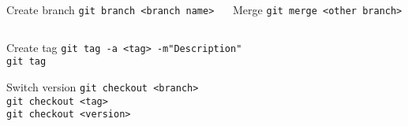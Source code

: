 \documentclass{beamer}
\begin{document}
\begin{frame}[t,squeeze]
\begin{columns}[T]
\begin{column}{.66\linewidth}
\begin{columns}
\begin{column}{.45\linewidth}
\begin{block}{Create branch}
                                \texttt{git branch <branch name>}
                        \end{block}
                    \end{column}
                    \begin{column}{.45\linewidth}
                        \begin{block}{Merge}
                                \texttt{git merge <other branch>}
                        \end{block}
                    \end{column}
                \end{columns}
                \vspace{-1mm}
                \begin{block}{Create tag}
                        \texttt{git tag -a <tag> -m"Description"}\\
                        \texttt{git tag}
                \end{block}
                \vspace{-1.5mm}
                \begin{block}{Switch version}
                        \texttt{git checkout <branch>}\\
                        \texttt{git checkout <tag>}\\
                        \texttt{git checkout <version>}
                \end{block}
            \end{column}
    \end{columns}
\end{frame}
\end{document}
